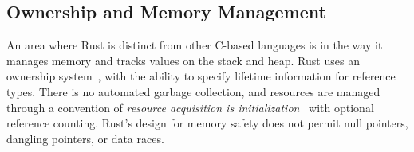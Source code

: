 \subsection{Ownership and Memory Management}

An area where Rust is distinct from other C-based languages is in the way it manages memory and tracks values on the stack and heap. Rust uses an ownership system~\cite[Chapter~4]{programming.rust.2021}, with the ability to specify lifetime information for reference types. There is no automated garbage collection, and resources are managed through a convention of \textit{resource acquisition is initialization}~\cite{cpp.design.evolution.1994} with optional reference counting. Rust's design for memory safety does not permit null pointers, dangling pointers, or data races.
